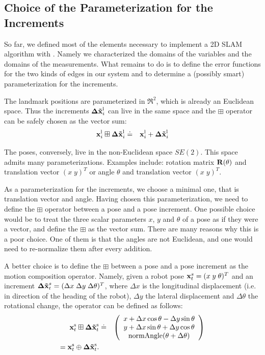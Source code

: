 \documentclass[a4paper]{article}
\begin{document}
\subsection{Choice of the Parameterization for the Increments}
So far, we defined most of the elements necessary to implement a 2D
SLAM algorithm with \gopt{}.  Namely we characterized the domains of
the variables and the domains of the measurements.  What remains to do
is to define the error functions for the two kinds of edges in our
system and to determine a (possibly smart) parameterization for the
increments.


The landmark positions are parameterized in $\Re^2$, which is already
an Euclidean space. Thus the increments $\mathbf{\Delta \tilde x}^\mathrm{l}_i$ can live in the same space and the
 $\boxplus$ operator can be safely chosen as the vector sum:
\begin{eqnarray}
  \mathbf{x}^\mathrm{l}_i \boxplus \mathbf{\Delta \tilde x}^\mathrm{l}_i   & \doteq & \mathbf{x}^\mathrm{l}_i + \mathbf{\Delta \tilde x}^\mathrm{l}_i
\end{eqnarray}

The poses, conversely, live in the non-Euclidean space $SE(2)$.
This space admits many parameterizations. Examples include:
rotation matrix $\mathbf{R}(\theta)$ and translation vector $(x \; y)^T$ or
angle $\theta$ and translation vector $(x \; y)^T$.

As a parameterization for the increments, we choose a minimal one,
that is translation vector and angle. Having chosen this
parameterization, we need to define the $\boxplus$ operator between a
pose and a pose increment.  One possible choice would be to treat the
three scalar parameters $x$, $y$ and $\theta$ of a pose as if they
were a vector, and define the $\boxplus$ as the vector sum.  There are
many reasons why this is a poor choice. One of them is that the angles
are not Euclidean, and one would need to re-normalize them after every
addition.

A better choice is to define the $\boxplus$ between a pose and a pose
increment as the motion composition operator. Namely, given a robot
pose $\mathbf{x}^{s}_t = (x\; y\; \theta)^T$ and an increment $\mathbf{\Delta \tilde x}^{s}_t
= (\Delta x\; \Delta y\; \Delta \theta)^T$, where $\Delta x$ is the
longitudinal displacement (i.e. in direction of the heading of the robot),
$\Delta y$ the lateral displacement and $\Delta \theta$ the rotational
change, the operator can be defined as follows:
\begin{eqnarray}
    \mathbf{x}^\mathrm{s}_t \boxplus \mathbf{\Delta \tilde x}^\mathrm{s}_t   & \doteq &
    \left(
    \begin{array}{c}
      x + \Delta x \cos \theta - \Delta y \sin \theta \\
      y + \Delta x \sin \theta + \Delta y \cos \theta \\
      \mathrm{normAngle}(\theta + \Delta \theta)
    \end{array}
    \right)\\
    = \mathbf{x}^\mathrm{s}_t \oplus \mathbf{\Delta \tilde x}^\mathrm{s}_t.
\end{eqnarray}
\end{document}

